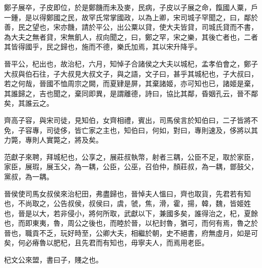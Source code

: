 \begin{pinyinscope}
鄭子展卒，子皮即位，於是鄭饑而未及麥，民病，子皮以子展之命，餼國人粟，戶一鍾，是以得鄭國之民，故罕氏常掌國政，以為上卿，宋司城子罕聞之，曰，鄰於善，民之望也，宋亦饑，請於平公，出公粟以貸，使大夫皆貸，司城氏貸而不書，為大夫之無者貸，宋無飢人，叔向聞之，曰，鄭之罕，宋之樂，其後亡者也，二者其皆得國乎，民之歸也，施而不德，樂氏加焉，其以宋升降乎。

晉平公，杞出也，故治杞，六月，知悼子合諸侯之大夫以城杞，孟孝伯會之，鄭子大叔與伯石往，子大叔見大叔文子，與之語，文子曰，甚乎其城杞也，子大叔曰，若之何哉，晉國不恤周宗之闕，而夏肄是屏，其棄諸姬，亦可知也已，諸姬是棄，其誰歸之，吉也聞之，棄同即異，是謂離德，詩曰，協比其鄰，昏姻孔云，晉不鄰矣，其誰云之。

齊高子容，與宋司徒，見知伯，女齊相禮，賓出，司馬侯言於知伯曰，二子皆將不免，子容專，司徒侈，皆亡家之主也，知伯曰，何如，對曰，專則速及，侈將以其力斃，專則人實斃之，將及矣。

范獻子來聘，拜城杞也，公享之，展莊叔執幣，射者三耦，公臣不足，取於家臣，家臣，展瑕，展玉父，為一耦，公臣，公巫，召伯仲，顏莊叔，為一耦，鄫鼓父，黨叔，為一耦。

晉侯使司馬女叔侯來治杞田，弗盡歸也，晉悼夫人慍曰，齊也取貨，先君若有知也，不尚取之，公告叔侯，叔侯曰，虞，虢，焦，滑，霍，揚，韓，魏，皆姬姓也，晉是以大，若非侵小，將何所取，武獻以下，兼國多矣，誰得治之，杞，夏餘也，而即東夷，魯，周公之後也，而睦於晉，以杞封魯，猶可，而何有焉，魯之於晉也，職貢不乏，玩好時至，公卿大夫，相繼於朝，史不絕書，府無虛月，如是可矣，何必瘠魯以肥杞，且先君而有知也，毋寧夫人，而焉用老臣。

杞文公來盟，書曰子，賤之也。


\end{pinyinscope}
